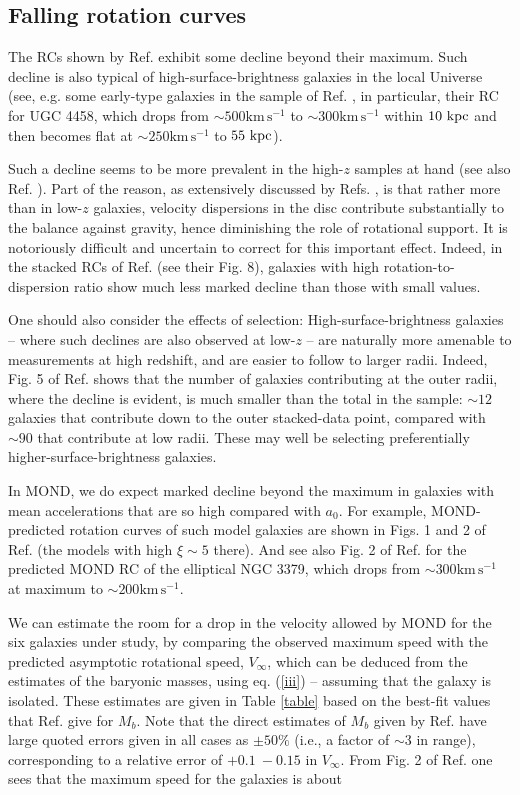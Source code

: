 \documentclass[twocolumn,showpacs,amsmath,amssymb,prd,nofootinbib]
{revtex4}
\def\sss{\scriptscriptstyle}
\def\_#1{_{\sss #1}}
\def\kpc{{\rm ~kpc}}
\def\az{a\_{0}}
\def\vinf{V_{\infty}}
\newcommand{\kms}{\ensuremath{\mathrm{km}\,\mathrm{s}^{-1}}}
\begin{document}
\subsection{Falling rotation curves}
The RCs shown by Ref. \cite{genzel17} exhibit some decline beyond their maximum. Such decline is also typical of high-surface-brightness galaxies in the local Universe (see, e.g. some early-type galaxies in the sample of Ref. \cite{sn07}, in particular, their RC for UGC 4458, which drops from $\sim 500\kms$ to $\sim 300\kms$ within $10 \kpc$ and then becomes flat at $\sim 250\kms$ to $55\kpc$).
\par
Such a decline seems to be more prevalent in the high-$z$ samples at hand (see also Ref. \cite{lang17}). Part of the reason, as extensively discussed by Refs. \cite{genzel17,lang17}, is that rather more than in low-$z$ galaxies, velocity dispersions in the disc contribute substantially to the balance against gravity, hence diminishing the role of rotational support. It is notoriously difficult and uncertain to correct for this important effect. Indeed, in the stacked RCs of Ref. \cite{lang17} (see their Fig. 8), galaxies with
high rotation-to-dispersion ratio show much less marked decline than those with small values.
\par
One should also consider the effects of selection: High-surface-brightness galaxies -- where such declines are also observed at low-$z$ -- are naturally more amenable to measurements at high redshift, and are easier to follow to larger radii. Indeed, Fig. 5 of Ref. \cite{lang17} shows that the number of galaxies contributing at the outer radii, where the decline is evident, is much smaller than the total in the sample: $\sim 12$ galaxies that contribute down to the outer stacked-data point, compared with $\sim 90$ that contribute at low radii. These may well be selecting preferentially higher-surface-brightness galaxies.
\par
In MOND, we do expect marked decline beyond the maximum in galaxies with mean accelerations that are so high compared with $\az$. For example, MOND-predicted rotation curves of such model galaxies are shown in Figs. 1 and 2
of Ref. \cite{milgrom83b} (the models with high $\xi\sim 5$ there). And see also Fig. 2 of Ref. \cite{ms03} for the predicted MOND RC of the elliptical NGC 3379, which drops from $\sim 300\kms$ at maximum to $\sim 200 \kms$.
\par
We can estimate the room for a drop in the velocity allowed by MOND for the six galaxies under study, by comparing the observed maximum speed with the predicted asymptotic rotational speed, $\vinf$, which can be deduced from the estimates of the baryonic masses, using eq. (\ref{iii}) -- assuming that the galaxy is isolated. These estimates are given in Table \ref{table} based on the best-fit values that Ref. \cite{genzel17} give for $M_b$. Note that the direct estimates of $M_b$ given by Ref. \cite{genzel17} have large quoted errors given in all cases as $\pm 50\%$ (i.e., a factor of $\sim 3$ in range), corresponding to a relative error of $+0.1~-0.15$ in $\vinf$. From Fig. 2 of Ref. \cite{genzel17} one sees that the maximum speed for the galaxies is about
\end{document}
